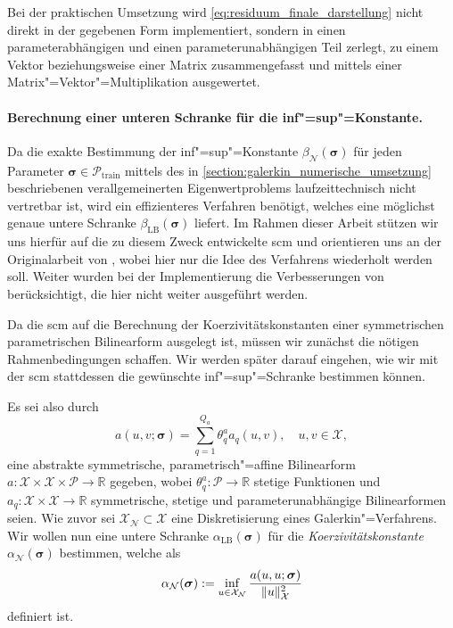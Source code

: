 \documentclass[../main.tex]{subfiles}
\begin{document}
Bei der praktischen Umsetzung wird \cref{eq:residuum_finale_darstellung} nicht direkt in der gegebenen Form implementiert, sondern in einen parameterabhängigen und einen parameterunabhängigen Teil zerlegt, zu einem Vektor beziehungsweise einer Matrix zusammengefasst und mittels einer Matrix"=Vektor"=Multiplikation ausgewertet.


\paragraph{Berechnung einer unteren Schranke für die inf"=sup"=Konstante.} %
\label{par:berechnung_der_unteren_schranke_f_r_die_inf_sup_konstante_}

Da die exakte Bestimmung der inf"=sup"=Konstante $\beta_{\mathcal N}(\bm \sigma)$ für jeden Parameter $\bm \sigma \in \mathcal P_{\mathrm{train}}$ mittels des in \cref{section:galerkin_numerische_umsetzung} beschriebenen verallgemeinerten Eigenwertproblems laufzeittechnisch nicht vertretbar ist, wird ein effizienteres Verfahren benötigt, welches eine möglichst genaue untere Schranke $\beta_{\mathrm{LB}}(\bm \sigma)$ liefert.
Im Rahmen dieser Arbeit stützen wir uns hierfür auf die zu diesem Zweck entwickelte \ac{scm} und orientieren uns an der Originalarbeit von \textcite{Huynh2007}, wobei hier nur die Idee des Verfahrens wiederholt werden soll.
Weiter wurden bei der Implementierung die Verbesserungen von \textcite{Chen2009} berücksichtigt, die hier nicht weiter ausgeführt werden.

Da die \ac{scm} auf die Berechnung der Koerzivitätskonstanten einer symmetrischen parametrischen Bilinearform ausgelegt ist, müssen wir zunächst die nötigen Rahmenbedingungen schaffen.
Wir werden später darauf eingehen, wie wir mit der \ac{scm} stattdessen die gewünschte inf"=sup"=Schranke bestimmen können.

Es sei also durch
\begin{equation}
    a(u, v; \bm \sigma) = \sum_{q = 1}^{Q_a} \theta_{q}^{a} a_{q}(u, v), \quad u,v \in \mathcal X,
\end{equation}
eine abstrakte symmetrische, parametrisch"=affine Bilinearform $a \colon \mathcal X \times \mathcal X \times \mathcal P \to \mathbb{R}$ gegeben, wobei $\theta_{q}^{a} \colon \mathcal P \to \mathbb{R}$ stetige Funktionen und $a_{q} \colon \mathcal X \times \mathcal X \to \mathbb{R}$ symmetrische, stetige und parameterunabhängige Bilinearformen seien.
Wie zuvor sei $\mathcal X_{\mathcal N} \subset \mathcal X$ eine Diskretisierung eines Galerkin"=Verfahrens.
Wir wollen nun eine untere Schranke $\alpha_{\mathrm{LB}}(\bm \sigma)$ für die \emph{Koerzivitätskonstante} $\alpha_{\mathcal N}(\bm \sigma)$ bestimmen, welche als
\begin{equation}
    \alpha_{\mathcal N}(\bm \sigma) := \inf_{u \in \mathcal X_{\mathcal N}} \frac{a(u, u; \bm \sigma)}{\lVert u\rVert_{\mathcal X}^{2}}
\end{equation}
definiert ist.
\end{document}
